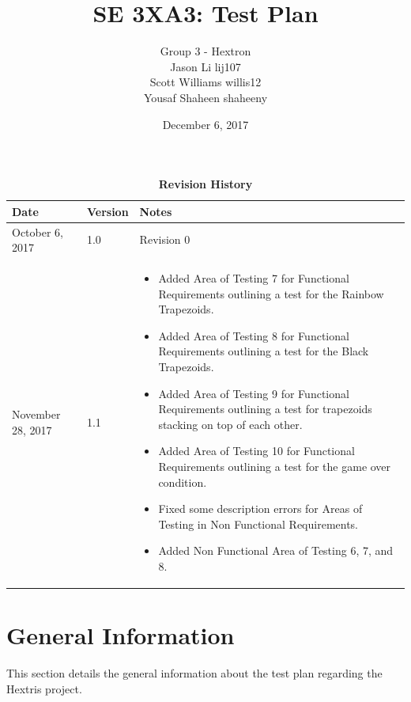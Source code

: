 \documentclass[12pt, titlepage]{article}
\title{SE 3XA3: Test Plan}
\author{Group 3 - Hextron
		\\ Jason Li lij107
		\\ Scott Williams willis12
		\\ Yousaf Shaheen shaheeny
}
\date{December 6, 2017}
\begin{document}
\maketitle

\tableofcontents
\listoffigures
\listoftables
\newpage
\begin{table}[]
\caption{\bf Revision History}
\begin{tabularx}{\textwidth}{p{3cm}p{2cm}X}
\toprule {\bf Date} & {\bf Version} & {\bf Notes}\\
\midrule
October 6, 2017 & 1.0 & Revision 0 \\
November 28, 2017 & 1.1 & \begin{itemize}[leftmargin=0cm,itemindent=.5cm,labelwidth=\itemindent,labelsep=0cm,align=left,itemsep = 0mm,nosep]

  \item Added Area of Testing 7 for Functional Requirements outlining a test for the Rainbow Trapezoids.
  \item Added Area of Testing 8 for Functional Requirements outlining a test for the Black Trapezoids.
  \item Added Area of Testing 9 for Functional Requirements outlining a test for trapezoids stacking on top of each other.
  \item Added Area of Testing 10 for Functional Requirements outlining a test for the game over condition.
  \item Fixed some description errors for Areas of Testing in Non Functional Requirements.
  \item Added Non Functional Area of Testing 6, 7, and 8.
  
\end{itemize} \\
\bottomrule
\end{tabularx}
\end{table}

\vspace*{\fill}


\newpage


\section{General Information}
\noindent This section details the general information about the test plan regarding the Hextris project.
\end{document}
